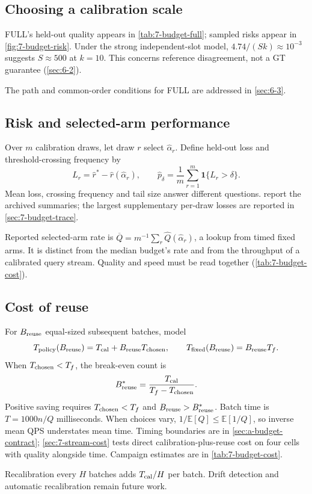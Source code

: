 \subsection{Choosing a calibration scale}

FULL's held-out quality appears in \cref{tab:7-budget-full}; sampled risks appear in \cref{fig:7-budget-risk}. Under the strong independent-slot model, $4.74/(Sk)\approx10^{-3}$ suggests $S\approx500$ at $k=10$. This concerns reference disagreement, not a GT guarantee (\cref{sec:6-2}).

The path and common-order conditions for FULL are addressed in
\cref{sec:6-3}.


\subsection{Risk and selected-arm performance}

Over $m$ calibration draws, let draw $r$ select $\widehat\alpha_r$.
Define held-out loss and threshold-crossing frequency by
\begin{equation}
 L_r=\widehat r^*-\widehat r(\widehat\alpha_r),\qquad
 \widehat p_\delta=\frac{1}{m}\sum_{r=1}^{m}\mathbf1\{L_r>\delta\}.
 \label{eq:6-risk}
\end{equation}
Mean loss, crossing frequency and tail size answer different questions.
 report the archived summaries;
the largest supplementary per-draw losses are reported in \cref{sec:7-budget-trace}.

Reported selected-arm rate is
$\overline Q=m^{-1}\sum_r\widehat Q(\widehat\alpha_r)$, a lookup from timed
fixed arms. It is distinct from the median budget's rate and from the
throughput of a calibrated query stream. Quality and speed must be read
together (\cref{tab:7-budget-cost}).

\subsection{Cost of reuse}

For $B_{\rm reuse}$ equal-sized subsequent batches, model
\begin{equation}
 T_{\rm policy}(B_{\rm reuse})=T_{\rm cal}+B_{\rm reuse}T_{\rm chosen},\qquad
 T_{\rm fixed}(B_{\rm reuse})=B_{\rm reuse}T_f.
 \label{eq:6-total-cost}
\end{equation}
When $T_{\rm chosen}<T_f$, the break-even count is
\begin{equation}
 B_{\rm reuse}^*=\frac{T_{\rm cal}}{T_f-T_{\rm chosen}}.
 \label{eq:6-payback}
\end{equation}
Positive saving requires $T_{\rm chosen}<T_f$ and
$B_{\rm reuse}>B_{\rm reuse}^*$. Batch time is $T=1000n/Q$ milliseconds.
When choices vary, $1/\mathbb E[Q]\leq\mathbb E[1/Q]$, so inverse mean
QPS understates mean time. Timing boundaries are in
\cref{sec:a-budget-contract}; \cref{sec:7-stream-cost} tests direct
calibration-plus-reuse cost on four cells with quality alongside time.
Campaign estimates are in \cref{tab:7-budget-cost}.

Recalibration every $H$ batches adds $T_{\rm cal}/H$ per batch.
Drift detection and automatic recalibration remain future work.
